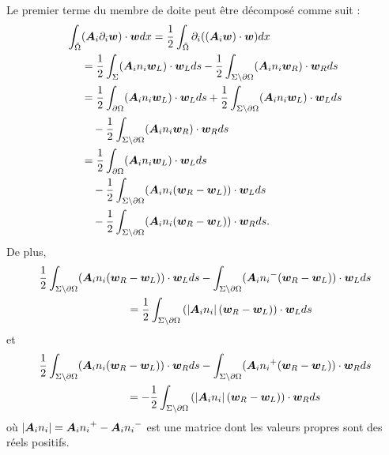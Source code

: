 Le premier terme du membre de doite peut être décomposé comme suit :
\begin{equation}
	\begin{aligned}
		\int_{\tilde{\Omega}} &({\bm{A}_{i}\partial_{i}} \bm{w}) \cdot \bm{w} dx
		= \frac{1}{2} \int_{\tilde{\Omega}} \partial_{i} ((\bm{A}_{i} \bm{w}) \cdot \bm{w}) dx \\
		&= \frac{1}{2} \int_{\Sigma} ({\bm{A}_{i}n_{i}} \bm{w}_L) \cdot \bm{w}_L ds
		- \frac{1}{2} \int_{\Sigma \setminus \partial\Omega}
			({\bm{A}_{i}n_{i}} \bm{w}_R) \cdot \bm{w}_R ds\\
		&= \frac{1}{2} \int_{\partial\Omega} ({\bm{A}_{i}n_{i}} \bm{w}_L) \cdot \bm{w}_L ds
		+ \frac{1}{2} \int_{\Sigma \setminus \partial\Omega}
			({\bm{A}_{i}n_{i}} \bm{w}_L) \cdot \bm{w}_L ds \\
		&\quad - \frac{1}{2} \int_{\Sigma \setminus \partial\Omega}
			({\bm{A}_{i}n_{i}} \bm{w}_R) \cdot \bm{w}_R ds \\
		&= \frac{1}{2} \int_{\partial\Omega} ({\bm{A}_{i}n_{i}} \bm{w}_L) \cdot \bm{w}_L ds \\
		&\quad - \frac{1}{2} \int_{\Sigma \setminus \partial\Omega}
			({\bm{A}_{i}n_{i}} (\bm{w}_R - \bm{w}_L)) \cdot \bm{w}_L ds \\
		&\quad - \frac{1}{2} \int_{\Sigma \setminus \partial\Omega}
			({\bm{A}_{i}n_{i}} (\bm{w}_R - \bm{w}_L)) \cdot \bm{w}_R ds .
	\end{aligned}
\end{equation}
De plus,
\begin{equation}
	\begin{aligned}
		\frac{1}{2} \int_{\Sigma \setminus \partial\Omega}
			({\bm{A}_{i}n_{i}} (\bm{w}_R &- \bm{w}_L)) \cdot \bm{w}_L ds
		- \int_{\Sigma \setminus \partial\Omega}
			({\bm{A}_{i}n_{i}}^{-} (\bm{w}_R - \bm{w}_L)) \cdot \bm{w}_L ds \\
		&= \frac{1}{2} \int_{\Sigma \setminus \partial\Omega}
			\left( \left\vert{\bm{A}_{i}n_{i}}\right\vert (\bm{w}_R - \bm{w}_L) \right) \cdot \bm{w}_L ds
	\end{aligned}
\end{equation}
et
\begin{equation}
	\begin{aligned}
		\frac{1}{2} \int_{\Sigma \setminus \partial\Omega}
			({\bm{A}_{i}n_{i}} (\bm{w}_R &- \bm{w}_L)) \cdot \bm{w}_R ds
		- \int_{\Sigma \setminus \partial\Omega}
			({\bm{A}_{i}n_{i}}^{+} (\bm{w}_R - \bm{w}_L)) \cdot \bm{w}_R ds \\
		&= - \frac{1}{2} \int_{\Sigma \setminus \partial\Omega}
			\left( \left\vert{\bm{A}_{i}n_{i}}\right\vert (\bm{w}_R - \bm{w}_L) \right) \cdot \bm{w}_R ds
	\end{aligned}
\end{equation}
où $\left\vert{\bm{A}_{i}n_{i}}\right\vert = {\bm{A}_{i}n_{i}}^{+} - {\bm{A}_{i}n_{i}}^{-}$ est une matrice dont les
valeurs propres sont des réels positifs.

